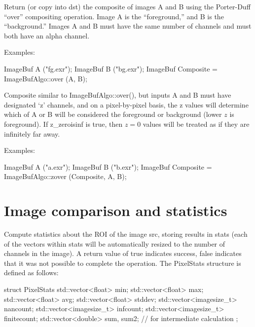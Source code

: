 Return (or copy into {\cf dst}) the composite of 
images {\cf A} and {\cf B} using the Porter-Duff ``over'' compositing
operation.  Image {\cf A} is the
``foreground,'' and {\cf B} is the ``background.''  Images {\cf A} and
{\cf B} must have the same number of channels and must both have an
alpha channel.

\smallskip
\noindent Examples:
\begin{code}
    ImageBuf A ("fg.exr");
    ImageBuf B ("bg.exr");
    ImageBuf Composite = ImageBufAlgo::over (A, B);
\end{code}
\apiend


 

Composite similar to {\cf ImageBufAlgo::over()}, but inputs {\cf A} and
{\cf B} must have designated `z' channels, and on a pixel-by-pixel basis,
the z values will determine which of A or B will be considered the
foreground or background (lower $z$ is foreground).  If {\cf z_zeroisinf} is
{\cf true}, then $z=0$ values will be treated as if they are infinitely far
away.

\smallskip
\noindent Examples:
\begin{code}
    ImageBuf A ("a.exr");
    ImageBuf B ("b.exr");
    ImageBuf Composite = ImageBufAlgo::zover (Composite, A, B);
\end{code}
\apiend


\section{Image comparison and statistics}
\label{sec:iba:stats}

 
\label{sec:iba:computePixelStats}

Compute statistics about the ROI of the image {\cf src}, storing results
in {\cf stats} (each of the vectors within {\cf stats} will be
automatically resized to the number of channels in the image).  A return
value of {\cf true} indicates success, {\cf false} indicates that it was
not possible to complete the operation.
 The {\cf PixelStats} structure is defined as follows:
\begin{code}
struct PixelStats {
    std::vector<float> min;
    std::vector<float> max;
    std::vector<float> avg;
    std::vector<float> stddev;
    std::vector<imagesize_t> nancount;
    std::vector<imagesize_t> infcount;
    std::vector<imagesize_t> finitecount;
    std::vector<double> sum, sum2;  // for intermediate calculation
};
\end{code}

